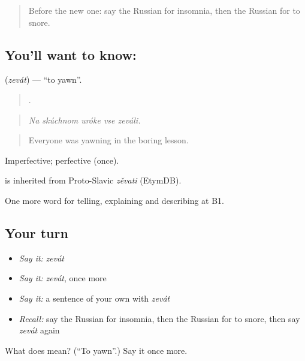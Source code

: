 \label{lesson:RU-C488-zevat}



\begin{quote}
Before the new one: say the Russian for insomnia, then the Russian for to snore.
\end{quote}

\subsection*{You'll want to know: }
\textbf{} (\emph{zevát}) — \textquotedblleft{}to yawn\textquotedblright{}.

\begin{quote}
    .
\end{quote}

\begin{quote}
\emph{Na skúchnom uróke vse zeváli.}
\end{quote}

\begin{quote}
Everyone was yawning in the boring lesson.
\end{quote}

Imperfective; perfective  (once).

\begin{cousinweb}
\emph{} is inherited from Proto-Slavic \emph{zěvati} (EtymDB).
\end{cousinweb}

\begin{grammarlens}[title={What you've built}]
One more word for telling, explaining and describing at B1.
\end{grammarlens}

\subsection*{Your turn}
\begin{itemize}
\raggedright
  \item \emph{Say it:} \emph{zevát}
  \item \emph{Say it:} \emph{zevát}, once more
  \item \emph{Say it:} a sentence of your own with \emph{zevát}
  \item \emph{Recall:} say the Russian for insomnia, then the Russian for to snore, then say \emph{zevát} again
\end{itemize}

\begin{tcolorbox}[breakable,colback=teal!4,colframe=teal!35!black,title={Before you move on}]
What does  mean? (\textquotedblleft{}To yawn\textquotedblright{}.) Say it once more.
\end{tcolorbox}
